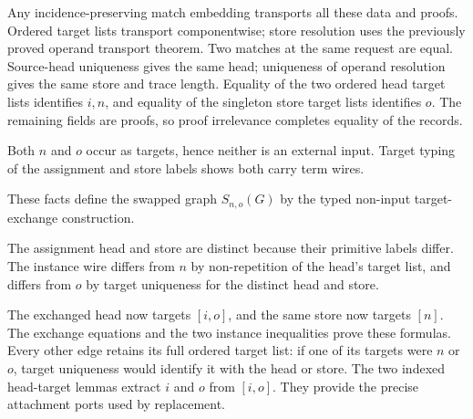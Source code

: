 
Any incidence-preserving match embedding transports all these data and
proofs. Ordered target lists transport componentwise; store resolution uses
the previously proved operand transport theorem. Two matches at the same
request are equal. Source-head uniqueness gives the same head; uniqueness
of operand resolution gives the same store and trace length. Equality of
the two ordered head target lists identifies $i,n$, and equality of the
singleton store target lists identifies $o$. The remaining fields are proofs,
so proof irrelevance completes equality of the records.



Both $n$ and $o$ occur as targets, hence neither is an external input.
Target typing of the assignment and store labels shows both carry term
wires.




These facts define the swapped graph $S_{n,o}(G)$ by the typed
non-input target-exchange construction.


The assignment head and store are distinct because their primitive labels
differ. The instance wire differs from $n$ by non-repetition of the head's
target list, and differs from $o$ by target uniqueness for the distinct head
and store.




The exchanged head now targets $[i,o]$, and the same store now targets
$[n]$. The exchange equations and the two instance inequalities prove these
formulas. Every other edge retains its full ordered target list: if one of
its targets were $n$ or $o$, target uniqueness would identify it with the
head or store. The two indexed head-target lemmas extract $i$ and $o$ from
$[i,o]$. They provide the precise attachment ports used by replacement.

